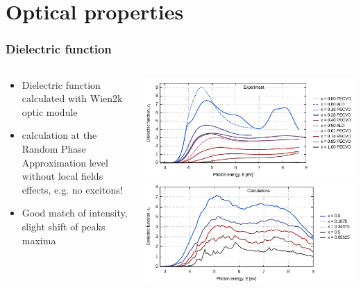 \documentclass[noamsthm,8pt,t]{beamer}
\begin{document}
\section{Optical properties}

\begin{frame}
   \frametitle{Dielectric function}

   \begin{columns}
      \begin{column}{0.3\textwidth}
         \begin{itemize}
            \item Dielectric function calculated with Wien2k optic module 
            \item calculation at the Random Phase Approximation level without local fields effects, e.g. no excitons!
            \item Good match of intensity, slight shift of peaks maxima
         \end{itemize}
      \end{column}
      \begin{column}{0.7\textwidth}
         \begin{center}
            \includegraphics[width=\linewidth]{figures/epsi.pdf}
            \newline
            \includegraphics[width=\linewidth]{figures/epsi-calc.pdf}
         \end{center}
      \end{column}
   \end{columns}
\end{frame}
\end{document}
